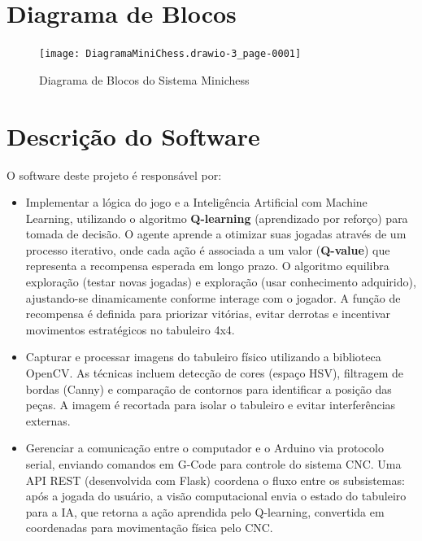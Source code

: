 \documentclass[a4paper,12pt]{article}
\begin{document}
\section{Diagrama de Blocos}
\begin{figure}[H]
    \centering
    \texttt{[image: DiagramaMiniChess.drawio-3\_page-0001]} %
    \caption{Diagrama de Blocos do Sistema Minichess}
    \label{fig:diagrama}
\end{figure}

\clearpage
\vspace{1em}

\section{Descrição do Software}
O software deste projeto é responsável por:
\begin{itemize}
    \item Implementar a lógica do jogo e a Inteligência Artificial com Machine Learning, utilizando o algoritmo \textbf{Q-learning} (aprendizado por reforço) para tomada de decisão. O agente aprende a otimizar suas jogadas através de um processo iterativo, onde cada ação é associada a um valor (\textbf{Q-value}) que representa a recompensa esperada em longo prazo. O algoritmo equilibra exploração (testar novas jogadas) e exploração (usar conhecimento adquirido), ajustando-se dinamicamente conforme interage com o jogador. A função de recompensa é definida para priorizar vitórias, evitar derrotas e incentivar movimentos estratégicos no tabuleiro 4x4.
    
    \item Capturar e processar imagens do tabuleiro físico utilizando a biblioteca OpenCV. As técnicas incluem detecção de cores (espaço HSV), filtragem de bordas (Canny) e comparação de contornos para identificar a posição das peças. A imagem é recortada para isolar o tabuleiro e evitar interferências externas.
    
    \item Gerenciar a comunicação entre o computador e o Arduino via protocolo serial, enviando comandos em G-Code para controle do sistema CNC. Uma API REST (desenvolvida com Flask) coordena o fluxo entre os subsistemas: após a jogada do usuário, a visão computacional envia o estado do tabuleiro para a IA, que retorna a ação aprendida pelo Q-learning, convertida em coordenadas para movimentação física pelo CNC.
\end{itemize}
\end{document}

